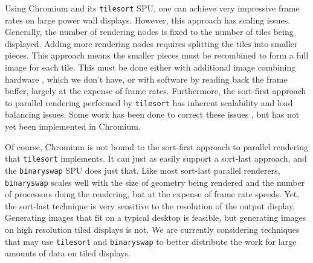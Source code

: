 \documentclass{acmsiggraph}
\newcommand{\cidentifier}[1]{\texttt{#1}}
\begin{document}
  Using Chromium and its \cidentifier{tile\-sort} SPU, one can achieve very
  impressive frame rates on large power wall displays.  However, this
  approach has scaling issues.  Generally, the number of rendering nodes is
  fixed to the number of tiles being displayed.  Adding more rendering
  nodes requires splitting the tiles into smaller pieces.  This approach
  means the smaller pieces must be recombined to form a full image for each
  tile.  This must be done either with additional image combining hardware
  \cite{Stoll01}, which we don't have, or with software by reading back the
  frame buffer, largely at the expense of frame rates.  Furthermore, the
  sort-first approach to parallel rendering performed by
  \cidentifier{tile\-sort} has inherent scalability and load balancing
  issues.  Some work has been done to correct these issues
  \cite{Samanta99}, but has not yet been implemented in Chromium.

  Of course, Chromium is not bound to the sort-first approach to parallel
  rendering that \cidentifier{tile\-sort} implements.  It can just as
  easily support a sort-last approach, and the \cidentifier{binary\-swap}
  SPU does just that.  Like most sort-last parallel renderers,
  \cidentifier{binary\-swap} scales well with the size of geometry being
  rendered and the number of processors doing the rendering, but at the
  expense of frame rate speeds.  Yet, the sort-last technique is very
  sensitive to the resolution of the output display.  Generating images
  that fit on a typical desktop is feasible, but generating images on high
  resolution tiled displays is not.  We are currently considering
  techniques that may use \cidentifier{tile\-sort} and
  \cidentifier{binary\-swap} to better distribute the work for large
  amounts of data on tiled displays.

\end{document}
